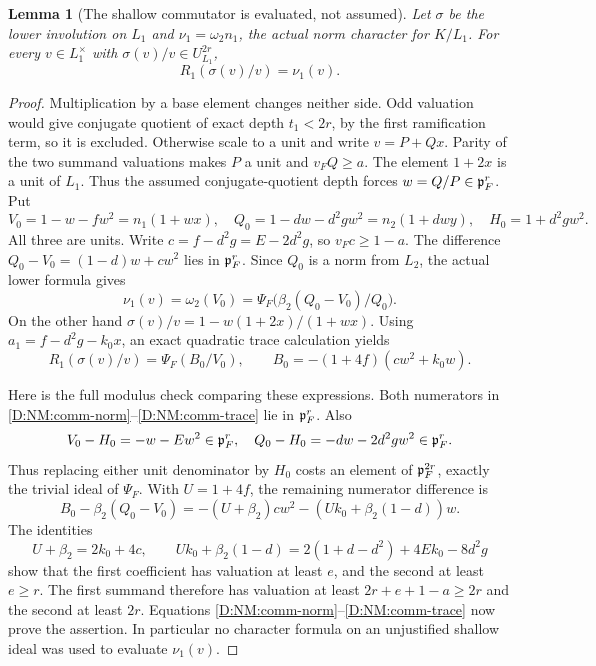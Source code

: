\documentclass[11pt]{amsart}
\newtheorem{lemma}[theorem]{Lemma}
\theoremstyle{definition}
\theoremstyle{remark}
\begin{document}
\begin{lemma}[The shallow commutator is evaluated, not assumed]\label{D:NM:commmodel}
Let $\sigma$ be the lower involution on $L_1$ and
$\nu_1=\omega_2 n_1$, the actual norm character for $K/L_1$.
For every $v\in L_1^\times$ with $\sigma(v)/v\in U_{L_1}^{2r}$,
\begin{equation}\label{D:NM:commmodel-eq}
 R_1(\sigma(v)/v)=\nu_1(v).
\end{equation}
\end{lemma}
\begin{proof}
Multiplication by a base element changes neither side. Odd valuation
would give conjugate quotient of exact depth $t_1<2r$, by the first
ramification term, so it is excluded. Otherwise scale to a unit and
write $v=P+Qx$. Parity of the two summand valuations makes $P$ a unit
and $v_FQ\ge a$. The element $1+2x$ is a unit of $L_1$. Thus the
assumed conjugate-quotient depth forces $w=Q/P\in\mathfrak p_F^r$.
Put
\[
 V_0=1-w-fw^2=n_1(1+wx),\quad
 Q_0=1-dw-d^2gw^2=n_2(1+dwy),\quad H_0=1+d^2gw^2.
\]
All three are units. Write $c=f-d^2g=E-2d^2g$, so $v_Fc\ge1-a$.
The difference $Q_0-V_0=(1-d)w+cw^2$ lies in $\mathfrak p_F^r$.
Since $Q_0$ is a norm from $L_2$, the actual lower formula gives
\begin{equation}\label{D:NM:comm-norm}
 \nu_1(v)=\omega_2(V_0)=
 \Psi_F\bigl(\beta_2(Q_0-V_0)/Q_0\bigr).
\end{equation}
On the other hand $\sigma(v)/v=1-w(1+2x)/(1+wx)$.
Using $a_1=f-d^2g-k_0x$, an exact quadratic trace calculation yields
\begin{equation}\label{D:NM:comm-trace}
 R_1(\sigma(v)/v)=\Psi_F(B_0/V_0),\qquad
 B_0=- (1+4f)(cw^2+k_0w).
\end{equation}

Here is the full modulus check comparing these expressions.
Both numerators in \eqref{D:NM:comm-norm}--\eqref{D:NM:comm-trace} lie in
$\mathfrak p_F^r$. Also
\[
 V_0-H_0=-w-Ew^2\in\mathfrak p_F^r,\quad
 Q_0-H_0=-dw-2d^2gw^2\in\mathfrak p_F^r.
\]
Thus replacing either unit denominator by $H_0$ costs an element of
$\mathfrak p_F^{2r}$, exactly the trivial ideal of $\Psi_F$.
With $U=1+4f$, the remaining numerator difference is
\[
 B_0-\beta_2(Q_0-V_0)
 =-(U+\beta_2)cw^2-(Uk_0+\beta_2(1-d))w.
\]
The identities
\[
 U+\beta_2=2k_0+4c,\qquad
 Uk_0+\beta_2(1-d)=2(1+d-d^2)+4Ek_0-8d^2g
\]
show that the first coefficient has valuation at least $e$, and the
second at least $e\ge r$. The first summand therefore has valuation
at least $2r+e+1-a\ge2r$ and the second at least $2r$.
Equations \eqref{D:NM:comm-norm}--\eqref{D:NM:comm-trace} now prove the assertion.
In particular no character formula on an unjustified shallow ideal was
used to evaluate $\nu_1(v)$.
\end{proof}
\end{document}
